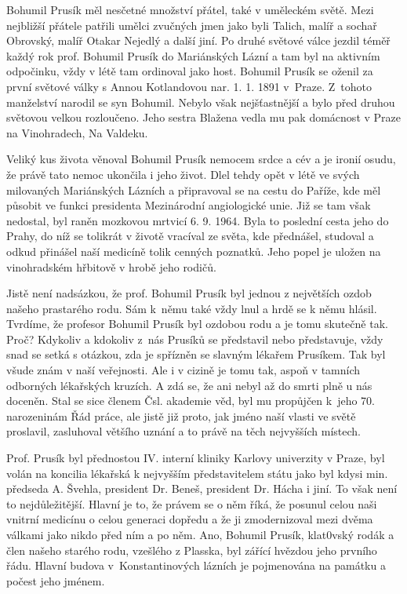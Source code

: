 \documentclass[../dejiny-rodu-prusiku.tex]{subfiles}
\begin{document}
Bohumil Prusík měl nesčetné množství přátel, také v uměleckém světě. Mezi nejbližší přátele patřili umělci zvučných jmen jako byli Talich, malíř a sochař Obrovský, malíř Otakar Nejedlý a další jiní. Po druhé světové válce jezdil téměř každý rok prof. Bohumil Prusík do Mariánských Lázní a tam byl na aktivním odpočinku, vždy v létě tam ordinoval jako host. Bohumil Prusík se oženil za první světové války s Annou Kotlandovou nar. 1. 1. 1891 v Praze. Z tohoto manželství narodil se syn Bohumil. Nebylo však nejšťastnější a bylo před druhou světovou velkou rozloučeno. Jeho sestra Blažena vedla mu pak domácnost v Praze na Vinohradech, Na Valdeku.

Veliký kus života věnoval Bohumil Prusík nemocem srdce a cév a je ironií osudu, že právě tato nemoc ukončila i jeho život. Dlel tehdy opět v létě ve svých milovaných Mariánských Lázních a připravoval se na cestu do Paříže, kde měl působit ve funkci presidenta Mezinárod­ní angiologické unie. Již se tam však nedostal, byl raněn mozkovou mrtvicí 6. 9. 1964. Byla to poslední cesta jeho do Prahy, do níž se tolikrát v životě vracíval ze světa, kde přednášel, studoval a odkud přinášel naší medicíně tolik cenných poznatků. Jeho popel je uložen na vinohradském hřbitově v hrobě jeho rodičů.

Jistě není nadsázkou, že prof. Bohumil Prusík byl jednou z největších ozdob našeho prastarého rodu. Sám k němu také vždy lnul a hrdě se k němu hlásil. Tvrdíme, že profesor Bohumil Prusík byl ozdobou rodu a je tomu skutečně tak. Proč? Kdykoliv a kdokoliv z nás Prusíků se představil nebo představuje, vždy snad se setká s otázkou, zda je spřízněn se slavným lékařem Prusíkem. Tak byl všude znám v naší veřejnosti. Ale i v cizině je tomu tak, aspoň v tamních odborných lékařských kruzích. A zdá se, že ani nebyl až do smrti plně u nás doceněn. Stal se sice členem Čsl. akademie věd, byl mu propůjčen k jeho 70. narozeninám Řád práce, ale jistě již proto, jak jméno naší vlasti ve světě proslavil, zasluhoval většího uznání a to právě na těch nejvyšších místech.

Prof. Prusík byl přednostou IV. interní kliniky Karlovy univerzity v Praze, byl volán na koncilia lékařská k nejvyšším představitelem státu jako byl kdysi min. předseda A. Švehla, president Dr. Beneš, president Dr. Hácha i jiní. To však není to nejdůležitější. Hlavní je to, že právem se o něm říká, že posunul celou naši vnitrní medicínu o celou generaci dopředu a že ji zmodernizoval mezi dvěma válkami jako nikdo před ním a po něm. Ano, Bohumil Prusík, klat0vský rodák a člen našeho starého rodu, vzešlého z Plasska, byl zářící hvězdou jeho prvního řádu. Hlavní budova v Konstantinových lázních je pojmenována na památku a počest jeho jménem.
\end{document}
